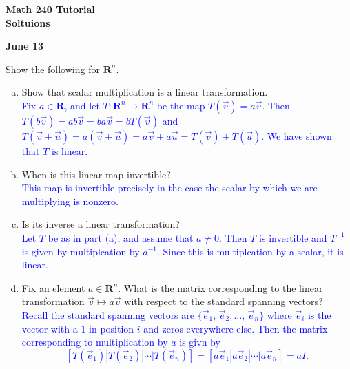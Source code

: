 \documentclass[a4paper,11pt]{article}
\newcommand{\R}{\mathbf{R}}
\newcommand{\BB}[1]{\textcolor{blue}{#1}}
\begin{document}
\begin{center}
  {\Large\bfseries Math 240 Tutorial \\ Soltuions}
\end{center}
\begin{center}
  {\bfseries June 13}
\end{center}

 Show the following for $\R^n$.
\begin{enumerate}[(a)]
\item Show that scalar multiplication is a linear transformation. \\

  \BB{Fix $a \in \R$, and let $T:\R^n \rightarrow \R^n$ be the map $T(\vec
    v)=a\vec v$. Then $T(b\vec v)=ab\vec v=ba\vec v=bT(\vec v)$ and $T(\vec
    v+\vec u)=a(\vec v+\vec u)=a\vec v+a\vec u=T(\vec v)+T(\vec u)$. We have
    shown that $T$ is linear. \\}

\item When is this linear map invertible? \\

  \BB{This map is invertible precisely in the case the scalar by which we are
    multiplying is nonzero. \\}
  
\item Is its inverse a linear transformation? \\

  \BB{Let $T$ be as in part (a), and assume that $a \neq 0$. Then $T$ is
    invertible and $T^{-1}$ is given by multiplcation by $a^{-1}$. Since this
    is multiplcation by a scalar, it is linear. \\}
  
\item Fix an element $a \in \R^n$. What is the matrix corresponding to the
linear transformation $\vec v \mapsto a\vec v$ with respect to the standard
spanning vectors? \\

\BB{Recall the standard spanning vectors are $\{\vec e_1,\,\vec e_2,\dots,\,\vec
  e_n\}$ where $\vec e_i$ is the vector with a 1 in position $i$ and zeros
  everywhere else. Then the matrix corresponding to multiplication by $a$ is
  givn by
  \[
    [T(\vec e_1) | T(\vec e_2) | \cdots | T(\vec e_n)]=
    [a\vec e_1 | a\vec e_2 | \cdots | a\vec e_n] = aI.
  \]
}
\end{enumerate}
\end{document}
